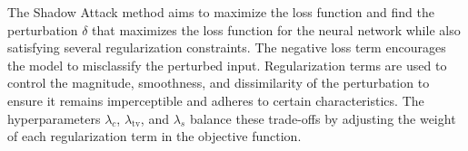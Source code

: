 The Shadow Attack method aims to maximize the loss function and find the perturbation $\delta$ that maximizes the loss function for the neural network while also satisfying several regularization constraints. The negative loss term encourages the model to misclassify the perturbed input. Regularization terms are used to control the magnitude, smoothness, and dissimilarity of the perturbation to ensure it remains imperceptible and adheres to certain characteristics. The hyperparameters $\lambda_c$, $\lambda_{\text{tv}}$, and $\lambda_s$ balance these trade-offs by adjusting the weight of each regularization term in the objective function.